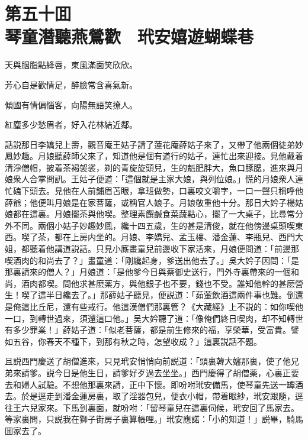 
\chapter*{第五十囬　\\琴童潛聽燕鶯歡　玳安嬉遊蝴蝶巷}


\begin{myquote}
天與胭脂點絳唇，東風滿面笑欣欣。

芳心自是歡情足，醉臉常含喜氣新。

傾國有情偏惱客，向陽無語笑撩人。

紅塵多少愁眉者，好入花林結近鄰。
\end{myquote}

話説那日李嬌兒上壽，觀音庵王姑子請了蓮花庵薛姑子來了，又帶了他兩個徒弟妙鳳妙趣。月娘聽薛師父來了，知道他是個有道行的姑子，連忙出來迎接。見他戴着清淨僧帽，披着茶褐袈裟，剃的青旋旋頭兒，生的魁肥胖大，魚口豚腮，進來與月娘衆人合掌問訊。王姑子便道：「這個就是主家大娘，與列位娘。」慌的月娘衆人連忙磕下頭去。見他在人前鋪眉苫眼，拿班做勢，口裏咬文嚼字，一口一聲只稱呼他薛爺；他便叫月娘是在家菩薩，或稱官人娘子。月娘敬重他十分。那日大妗子楊姑娘都在這裏。月娘擺茶與他喫。整理素饌鹹食菜蔬點心，擺了一大桌子，比尋常分外不同。兩個小姑子妙趣妙鳳，纔十四五歲，生的甚是清俊，就在他傍邊桌頭喫東西。喫了茶，都在上房内坐的。月娘、李嬌兒、孟玉樓、潘金蓮、李瓶兒、西門大姐，都聽着他講道説話。只見小廝畫童兒前邊收下家活來，月娘便問道：「前邊那喫酒肉的和尚去了？」畫童道：「剛纔起身，爹送出他去了。」吳大妗子因問：「是那裏請來的僧人？」月娘道：「是他爹今日與蔡御史送行，門外寺裏帶來的一個和尚，酒肉都喫。問他求甚麽薬方，與他銀子也不要，錢也不受。誰知他幹的甚麽營生！喫了這半日纔去了。」那薛姑子聽見，便説道：「茹葷飲酒這兩件事也難。倒還是俺這比丘尼，還有些戒行。他這漢僧們那裏管？《大藏經》上不説的：如你喫他一口，到轉世過來，須還這口他。」吴大妗聽了道：「像俺們終日喫肉，却不知轉世有多少罪業！」薛姑子道：「似老菩薩，都是前生修來的福，享榮華，受富貴。譬如五谷，你春天不種下，到那有秋之時，怎望收成？」這裏説話不題。

且説西門慶送了胡僧進來，只見玳安悄悄向前説道：「頭裏韓大嬸那裏，使了他兄弟來請爹。説今日是他生日，請爹好歹過去坐坐。」西門慶得了胡僧薬，心裏正要去和婦人試驗。不想他那裏來請，正中下懷。即吩咐玳安備馬，使琴童先送一罈酒去。於是逕走到潘金蓮房裏，取了淫器包兒，便衣小帽，帶着眼紗，玳安跟隨，逕往王六兒家來。下馬到裏面，就吩咐：「留琴童兒在這裏伺候，玳安回了馬家去。等家裏問，只説我在獅子街房子裏算帳哩。」玳安應諾：「小的知道！」説畢，騎馬囬家去了。

